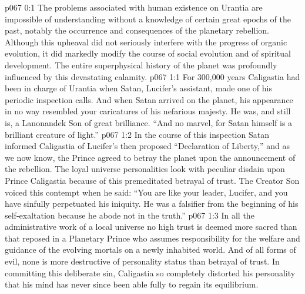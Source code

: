 \author{Melchizedek}
\vs p067 0:1 The problems associated with human existence on Urantia are impossible of understanding without a knowledge of certain great epochs of the past, notably the occurrence and consequences of the planetary rebellion. Although this upheaval did not seriously interfere with the progress of organic evolution, it did markedly modify the course of social evolution and of spiritual development. The entire superphysical history of the planet was profoundly influenced by this devastating calamity.
\vs p067 1:1 For 300,000 years Caligastia had been in charge of Urantia when Satan, Lucifer’s assistant, made one of his periodic inspection calls. And when Satan arrived on the planet, his appearance in no way resembled your caricatures of his nefarious majesty. He was, and still is, a Lanonandek Son of great brilliance. “And no marvel, for Satan himself is a brilliant creature of light.”
\vs p067 1:2 In the course of this inspection Satan informed Caligastia of Lucifer’s then proposed “Declaration of Liberty,” and as we now know, the Prince agreed to betray the planet upon the announcement of the rebellion. The loyal universe personalities look with peculiar disdain upon Prince Caligastia because of this premeditated betrayal of trust. The Creator Son voiced this contempt when he said: “You are like your leader, Lucifer, and you have sinfully perpetuated his iniquity. He was a falsifier from the beginning of his self\hyp{}exaltation because he abode not in the truth.”
\vs p067 1:3 In all the administrative work of a local universe no high trust is deemed more sacred than that reposed in a Planetary Prince who assumes responsibility for the welfare and guidance of the evolving mortals on a newly inhabited world. And of all forms of evil, none is more destructive of personality status than betrayal of trust. In committing this deliberate sin, Caligastia so completely distorted his personality that his mind has never since been able fully to regain its equilibrium.
